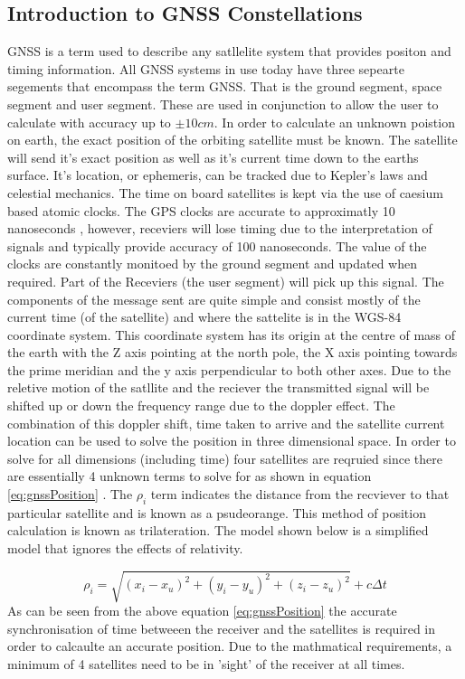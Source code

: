 \subsection{Introduction to GNSS Constellations}\label{subsec:GNSS_Intro}
GNSS is a term used to describe any satllelite system that provides positon and timing information. All GNSS systems in use today have three sepearte segements that
encompass the term GNSS. That is the ground segment, space segment and user segment. These are used in conjunction to allow the user to calculate with accuracy up to $\pm
10cm$. In order to calculate an unknown poistion on earth, the exact position of the orbiting satellite must be known. The satellite will send it's exact position as well
as it's current time down to the earths surface. It's location, or ephemeris, can be tracked due to Kepler's laws and celestial mechanics. The time on board satellites is
kept via the use of caesium based atomic clocks. The GPS clocks are accurate to approximatly 10 nanoseconds , however, receviers will lose timing due to
the interpretation of signals and typically provide accuracy of 100 nanoseconds. The value of the clocks are constantly monitoed by the ground segment and updated when
required. Part of the Receviers (the user segment) will pick up this signal. The components of the message sent are quite simple and consist
mostly of the current time (of the satellite) and where the sattelite is in the WGS-84 coordinate system\cite{RN46}. This coordinate system has its origin at the centre of mass of
the earth with the Z axis pointing at the north pole, the X axis pointing towards the prime meridian and the y axis perpendicular to both other axes. Due to the reletive
motion of the satllite and the reciever the transmitted signal will be shifted up or down the frequency range due to the doppler effect. The combination of this doppler
shift, time taken to arrive and the satellite current location can be used to solve the position in three dimensional space. In order to solve for all dimensions
(including time) four satellites are reqruied since there are essentially 4 unknown terms to solve for as shown in equation \ref{eq:gnssPosition} \cite{RN46}. The
$\rho_i$ term indicates the distance from the recviever to that particular satellite and is known as a psudeorange. 
This method of position calculation is known as trilateration. The model shown below is a simplified model that ignores the effects of relativity. 

\begin{equation} \label{eq:gnssPosition} 
    \rho_i = \sqrt{(x_i - x_u)^2 + (y_i - y_u)^2 + (z_i - z_u)^2} + c \Delta t
\end{equation}
As can be seen from the above equation \ref{eq:gnssPosition} the accurate synchronisation of time betweeen the receiver and the satellites is required in order to
calcaulte an accurate position. Due to the mathmatical requirements, a minimum of 4 satellites need to be in 'sight' of the receiver at all times.

